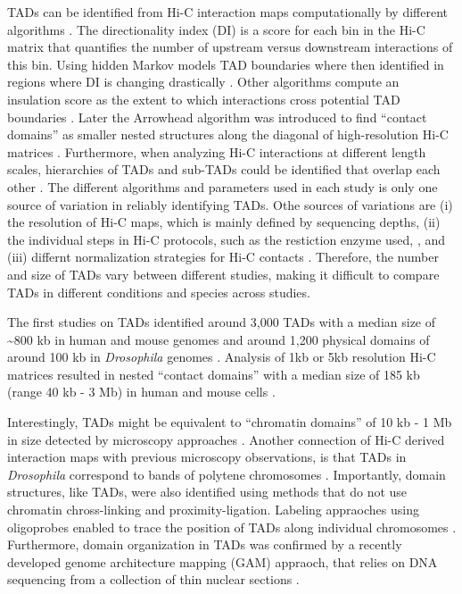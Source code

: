 \documentclass[a4paper,twoside=true,openright,parskip=full,chapterprefix=true,11pt,headings=normal,bibliography=totoc,listof=totoc,titlepage=on,captions=tableabove,draft=false]{scrreprt}
\theoremstyle{definition}
\theoremstyle{definition}
\theoremstyle{definition}
\theoremstyle{remark}
\begin{document}
TADs can be identified from Hi-C interaction maps computationally by
different algorithms \citep{Ay2015}. The directionality index (DI) is a
score for each bin in the Hi-C matrix that quantifies the number of
upstream versus downstream interactions of this bin. Using hidden Markov
models TAD boundaries where then identified in regions where DI is
changing drastically \citep{Dixon2012}. Other algorithms compute an
insulation score as the extent to which interactions cross potential TAD
boundaries \citep{Crane2015}. Later the Arrowhead algorithm was
introduced to find ``contact domains'' as smaller nested structures
along the diagonal of high-resolution Hi-C matrices \citep{Rao2014}.
Furthermore, when analyzing Hi-C interactions at different length
scales, hierarchies of TADs and sub-TADs could be identified that
overlap each other \citep{Filippova2014, Fraser2015}. The different
algorithms and parameters used in each study is only one source of
variation in reliably identifying TADs. Othe sources of variations are
(i) the resolution of Hi-C maps, which is mainly defined by sequencing
depths, (ii) the individual steps in Hi-C protocols, such as the
restiction enzyme used, \citep{Rao2014}, and (iii) differnt
normalization strategies for Hi-C contacts
\citep{Dali2017, Forcato2017}. Therefore, the number and size of TADs
vary between different studies, making it difficult to compare TADs in
different conditions and species across studies.

The first studies on TADs identified around 3,000 TADs with a median
size of \textasciitilde{}800 kb in human and mouse genomes
\citep{Dixon2012} and around 1,200 physical domains of around 100 kb in
\emph{Drosophila} genomes \citep{Sexton2012}. Analysis of 1kb or 5kb
resolution Hi-C matrices resulted in nested ``contact domains'' with a
median size of 185 kb (range 40 kb - 3 Mb) in human and mouse cells
\citep{Rao2014}.

Interestingly, TADs might be equivalent to ``chromatin domains'' of 10
kb - 1 Mb in size detected by microscopy approaches
\citep{Cremer2010, Gibcus2013}. Another connection of Hi-C derived
interaction maps with previous microscopy observations, is that TADs in
\emph{Drosophila} correspond to bands of polytene chromosomes
\citep{Eagen2015}. Importantly, domain structures, like TADs, were also
identified using methods that do not use chromatin chross-linking and
proximity-ligation. Labeling appraoches using oligoprobes enabled to
trace the position of TADs along individual chromosomes
\citep{Wang2016d}. Furthermore, domain organization in TADs was
confirmed by a recently developed genome architecture mapping (GAM)
appraoch, that relies on DNA sequencing from a collection of thin
nuclear sections \citep{Beagrie2017}.
\end{document}
